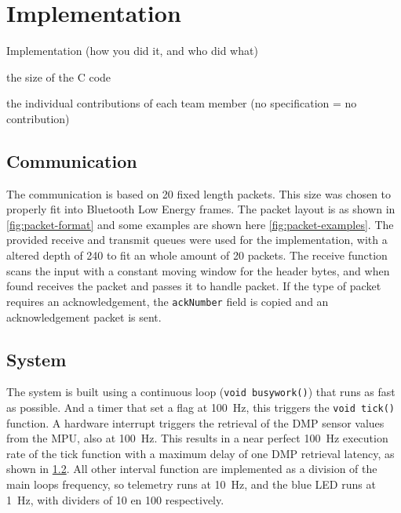 \documentclass[final]{article}
\begin{document}
\section{Implementation}
\label{sec:implmentation}
Implementation (how you did it, and who did what)

the size of the C code

the individual contributions of each team member (no specification = no contribution)


\subsection{Communication}
The communication is based on \SI{20}{\byte} fixed length packets.
This size was chosen to properly fit into Bluetooth Low Energy frames.
The packet layout is as shown in \cref{fig:packet-format} and some examples are shown here \cref{fig:packet-examples}. %
The provided receive and transmit queues were used for the implementation, with a altered depth of \num{240} to fit an whole amount of \SI{20}{\byte} packets.
The receive function scans the input with a constant moving window for the header bytes, and when found receives the packet and passes it to handle packet.
If the type of packet requires an acknowledgement, the \texttt{ackNumber} field is copied and an acknowledgement packet is sent.


\subsection{System}
The system is built using a continuous loop (\texttt{void busywork()}) that runs as fast as possible.
And a timer that set a flag at \SI{100}{\hertz}, this triggers the \texttt{void tick()} function.
A hardware interrupt triggers the retrieval of the DMP sensor values from the MPU, also at \SI{100}{\hertz}.
This results in a near perfect \SI{100}{\hertz} execution rate of the tick function with a maximum delay of one DMP retrieval latency, as shown in \cref{}. %
All other interval function are implemented as a division of the main loops frequency, so telemetry runs at \SI{10}{\hertz}, and the blue LED runs at \SI{1}{\hertz}, with dividers of 10 en 100 respectively.
\end{document}
